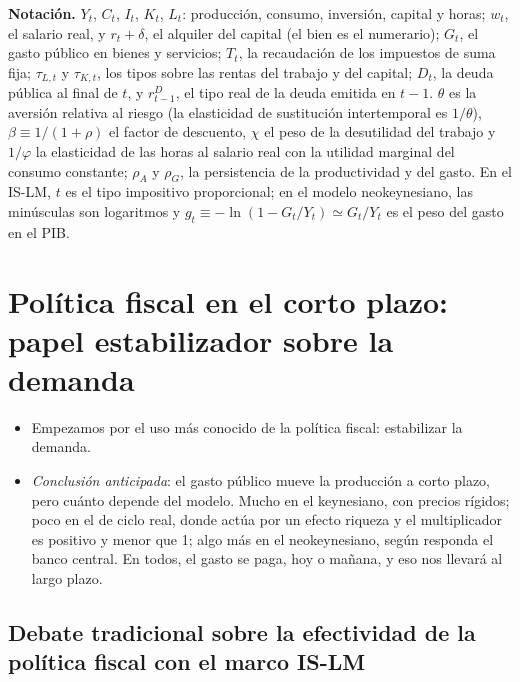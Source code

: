 \documentclass[11pt]{article}
\begin{document}
\begin{anotaciones}
\textbf{Notación.} $Y_t$, $C_t$, $I_t$, $K_t$, $L_t$: producción, consumo, inversión, capital y horas; $w_t$, el salario real, y $r_t+\delta$, el alquiler del capital (el bien es el numerario); $G_t$, el gasto público en bienes y servicios; $T_t$, la recaudación de los impuestos de suma fija; $\tau_{L,t}$ y $\tau_{K,t}$, los tipos sobre las rentas del trabajo y del capital; $D_t$, la deuda pública al final de $t$, y $r^D_{t-1}$, el tipo real de la deuda emitida en $t-1$. $\theta$ es la aversión relativa al riesgo (la elasticidad de sustitución intertemporal es $1/\theta$), $\beta\equiv1/(1+\rho)$ el factor de descuento, $\chi$ el peso de la desutilidad del trabajo y $1/\varphi$ la elasticidad de las horas al salario real con la utilidad marginal del consumo constante; $\rho_A$ y $\rho_G$, la persistencia de la productividad y del gasto. En el IS-LM, $t$ es el tipo impositivo proporcional; en el modelo neokeynesiano, las minúsculas son logaritmos y $g_t\equiv-\ln(1-G_t/Y_t)\simeq G_t/Y_t$ es el peso del gasto en el PIB.
\end{anotaciones}

\section{Política fiscal en el corto plazo:\cortetitulo{} papel estabilizador sobre la demanda}\label{sec:corto-plazo}

\begin{itemize}
\item Empezamos por el uso más conocido de la política fiscal: estabilizar la demanda.
\item \emph{Conclusión anticipada}: el gasto público mueve la producción a corto plazo, pero cuánto depende del modelo. Mucho en el keynesiano, con precios rígidos; poco en el de ciclo real, donde actúa por un efecto riqueza y el multiplicador es positivo y menor que 1; algo más en el neokeynesiano, según responda el banco central. En todos, el gasto se paga, hoy o mañana, y eso nos llevará al largo plazo.
\end{itemize}

\subsection{Debate tradicional sobre la efectividad de la política fiscal con el marco IS-LM}\label{sec:islm}
\end{document}
